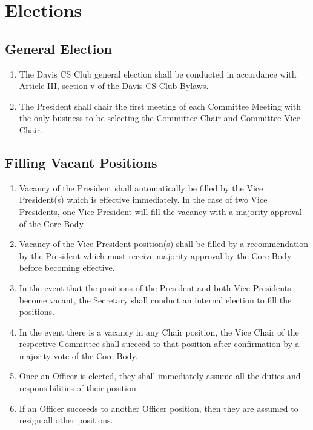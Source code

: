 \documentclass{article}
\newenvironment{li}{
\begin{enumerate}
  \setlength{\itemsep}{1pt}
  \setlength{\parskip}{0pt}
  \setlength{\parsep}{0pt}
}{\end{enumerate}}
\begin{document}

\section{Elections}
\subsection{General Election}
\begin{li}
\item The Davis CS Club general election shall be conducted in accordance with Article III, section v of the Davis CS Club Bylaws.
\item The President shall chair the first meeting of each Committee Meeting with the only business to be selecting the Committee Chair and Committee Vice Chair.
\end{li}
\subsection{Filling Vacant Positions}
\begin{li}
\item Vacancy of the President shall automatically be filled by the Vice President(s) which is effective immediately. In the case of two Vice Presidents, one Vice President will fill the vacancy with a majority approval of the Core Body.
\item Vacancy of the Vice President position(s) shall be filled by a recommendation by the President which must receive majority approval by the Core Body before becoming effective.
\item In the event that the positions of the President and both Vice Presidents become vacant, the Secretary shall conduct an internal election to fill the positions.
\item In the event there is a vacancy in any Chair position, the Vice Chair of the respective Committee shall succeed to that position after confirmation by a majority vote of the Core Body.
\item Once an Officer is elected, they shall immediately assume all the duties and responsibilities of their position.
\item If an Officer succeeds to another Officer position, then they are assumed to resign all other positions.
\end{li}

\end{document}
